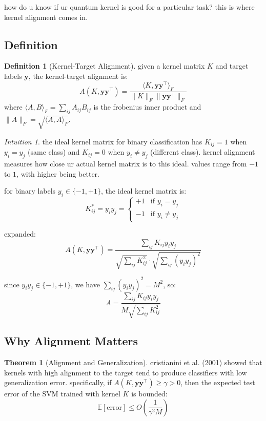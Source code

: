\documentclass[11pt,a4paper]{article}
\theoremstyle{definition}
\newtheorem{definition}{Definition}[section]
\newtheorem{theorem}{Theorem}[section]
\theoremstyle{remark}
\newtheorem*{intuition}{Intuition}
\begin{document}
how do u know if ur quantum kernel is good for a particular task? this is where kernel alignment comes in.

\subsection{Definition}

\begin{definition}[Kernel-Target Alignment]
given a kernel matrix $K$ and target labels $\mathbf{y}$, the kernel-target alignment is:
\[
A(K, \mathbf{y}\mathbf{y}^\top) = \frac{\langle K, \mathbf{y}\mathbf{y}^\top \rangle_F}{\|K\|_F \|\mathbf{y}\mathbf{y}^\top\|_F}
\]
where $\langle A, B \rangle_F = \sum_{ij} A_{ij} B_{ij}$ is the frobenius inner product and $\|A\|_F = \sqrt{\langle A, A \rangle_F}$.
\end{definition}

\begin{intuition}
the ideal kernel matrix for binary classification has $K_{ij} = 1$ when $y_i = y_j$ (same class) and $K_{ij} = 0$ when $y_i \neq y_j$ (different class). kernel alignment measures how close ur actual kernel matrix is to this ideal. values range from $-1$ to $1$, with higher being better.
\end{intuition}

for binary labels $y_i \in \{-1, +1\}$, the ideal kernel matrix is:
\[
K^*_{ij} = y_i y_j = \begin{cases} +1 & \text{if } y_i = y_j \\ -1 & \text{if } y_i \neq y_j \end{cases}
\]

expanded:
\[
A(K, \mathbf{y}\mathbf{y}^\top) = \frac{\sum_{ij} K_{ij} y_i y_j}{\sqrt{\sum_{ij} K_{ij}^2} \cdot \sqrt{\sum_{ij} (y_i y_j)^2}}
\]

since $y_i y_j \in \{-1, +1\}$, we have $\sum_{ij}(y_i y_j)^2 = M^2$, so:
\[
A = \frac{\sum_{ij} K_{ij} y_i y_j}{M \sqrt{\sum_{ij} K_{ij}^2}}
\]

\subsection{Why Alignment Matters}

\begin{theorem}[Alignment and Generalization]
cristianini et al. (2001) showed that kernels with high alignment to the target tend to produce classifiers with low generalization error. specifically, if $A(K, \mathbf{y}\mathbf{y}^\top) \geq \gamma > 0$, then the expected test error of the SVM trained with kernel $K$ is bounded:
\[
\mathbb{E}[\text{error}] \leq O\!\left(\frac{1}{\gamma^2 M}\right)
\]
\end{theorem}
\end{document}
